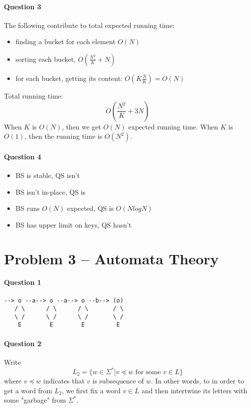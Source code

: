 \paragraph{Question 3}
The following contribute to total expected running time:
\begin{itemize}
    \item finding a bucket for each element $O(N)$
    \item sorting each bucket, $O(\frac{N^2}{K} + N)$
    \item for each bucket, getting its content: $O(K\frac{N}{K}) = O(N)$
\end{itemize}
Total running time:
\begin{equation*}
    O(\frac{N^2}{K} + 3N)
\end{equation*}
When $K$ is $O(N)$, then we get $O(N)$ expected running time.
When $K$ is $O(1)$, then the running time is $O(N^2)$.

\paragraph{Question 4}
\begin{itemize}
    \item BS is stable, QS isn't
    \item BS isn't in-place, QS is
    \item BS runs $O(N)$ expected, QS is $O(NlogN)$
    \item BS has upper limit on keys, QS hasn't
\end{itemize}




\section{Problem 3 – Automata Theory}
\paragraph{Question 1}
\begin{verbatim}
--> o --a--> o --a--> o --b--> (o)
   / \      / \      / \       / \
   \ /      \ /      \ /       \ /
    E        E        E         E
\end{verbatim}


\paragraph{Question 2}
Write
\begin{equation*}
    L_2 = \{w \in \Sigma^* | v \preceq w \text{ for some } v \in L \}
\end{equation*}
where $v \preceq w$ indicates that $v$ is subsequence of $w$.
In other words, to in order to get a word from $L_2$, we first fix a word $v \in L$ and then intertwine its letters with some "garbage" from $\Sigma^*$.

